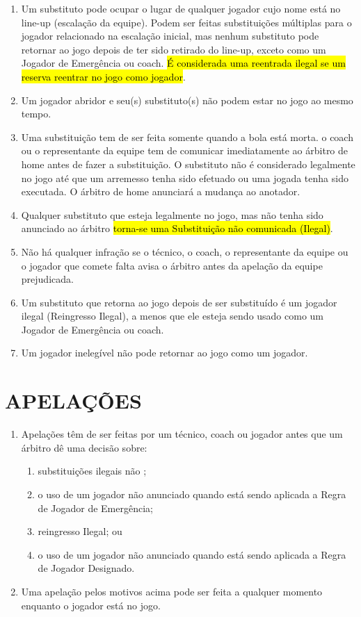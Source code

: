 \begin{enumerate}[label=(\alph*)]
	\item Um substituto pode ocupar o lugar de qualquer jogador cujo nome está no \gls{line-up} (escalação da equipe). Podem ser feitas substituições múltiplas para o jogador relacionado na escalação inicial, mas nenhum substituto pode retornar ao jogo depois de ter sido retirado do \gls{line-up}, exceto como um Jogador de Emergência ou \gls{coach}.
	\hl{\'E considerada uma reentrada ilegal se um reserva  reentrar no jogo como jogador}.
	\item Um jogador abridor e seu(s) substituto(s) não podem estar no jogo ao mesmo tempo.
	\item Uma substituição tem de ser feita somente quando a bola está morta. o \gls{coach} ou o representante da equipe tem de comunicar imediatamente ao árbitro de \gls{home} antes de fazer a substituição. O substituto não é considerado legalmente no jogo até que um arremesso tenha sido efetuado ou uma jogada  tenha sido executada.
	O árbitro de \gls{home} anunciará a mudança ao anotador.
	\item Qualquer substituto que esteja legalmente no jogo, mas não tenha sido anunciado ao árbitro \hl{torna-se uma Substitui\c{c}\~ao n\~ao comunicada (Ilegal)}.
	\item Não há qualquer infração se o técnico, o \gls{coach}, o representante da equipe ou o jogador que comete falta avisa o árbitro antes da apelação da equipe prejudicada.
	\item Um substituto que retorna ao jogo depois de ser substituído é um jogador ilegal (Reingresso Ilegal), a menos que ele esteja sendo usado como um Jogador de Emergência ou \gls{coach}.
	\item \begin{mdframed}[hidealllines=true,backgroundcolor=blue!20]
		Um jogador inelegível não pode retornar ao jogo como um jogador.\end{mdframed}
\end{enumerate}

\section{APELAÇÕES}
\begin{enumerate}[label=(\alph*)]
	\item Apelações têm de ser feitas por um técnico, \gls{coach} ou jogador antes que um árbitro dê uma decisão sobre:
	\begin{enumerate}[label=\roman*.]
		\item substituições ilegais não ;
		\item o uso de um jogador não anunciado quando está sendo aplicada a Regra de Jogador de Emergência;
		\item reingresso Ilegal; ou
		\item o uso de um jogador não anunciado quando está sendo aplicada a Regra de Jogador Designado.
	\end{enumerate}
	\item  Uma apelação pelos motivos acima pode ser feita a qualquer momento enquanto o jogador está no jogo.
\end{enumerate}


